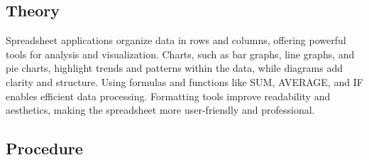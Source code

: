 \documentclass[a4paper,9pt]{article}
\begin{document}
\subsection{Theory}
Spreadsheet applications organize data in rows and columns, offering powerful tools for analysis and visualization. Charts, such as bar graphs, line graphs, and pie charts, highlight trends and patterns within the data, while diagrams add clarity and structure. Using formulas and functions like SUM, AVERAGE, and IF enables efficient data processing. Formatting tools improve readability and aesthetics, making the spreadsheet more user-friendly and professional.

\subsection{Procedure}
\end{document}

